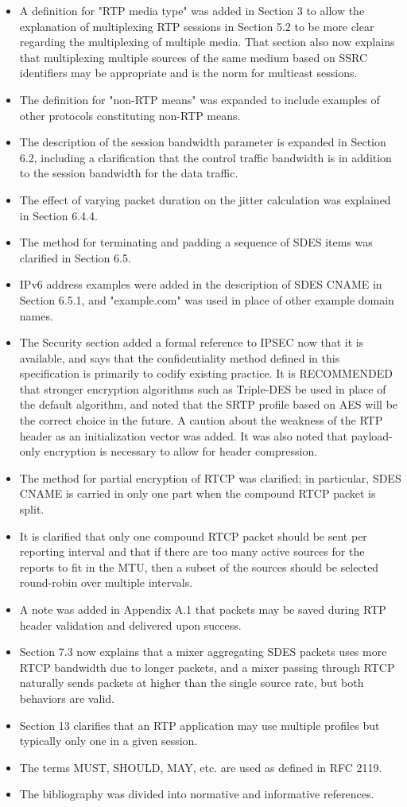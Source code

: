 \documentclass{article}
\begin{document}
\begin{itemize}
\begin{itemize}
\item A definition for "RTP media type" was added in Section 3 to allow the explanation of multiplexing RTP sessions in Section 5.2 to be more clear regarding the multiplexing of multiple media.  That section also now explains that multiplexing multiple sources of the same medium based on SSRC identifiers may be appropriate and is the norm for multicast sessions.
\item The definition for "non-RTP means" was expanded to include examples of other protocols constituting non-RTP means.
\item The description of the session bandwidth parameter is expanded in Section 6.2, including a clarification that the control traffic bandwidth is in addition to the session bandwidth for the data traffic.
\item The effect of varying packet duration on the jitter calculation was explained in Section 6.4.4.
\item The method for terminating and padding a sequence of SDES items was clarified in Section 6.5.
\item IPv6 address examples were added in the description of SDES CNAME in Section 6.5.1, and "example.com" was used in place of other example domain names.
\item The Security section added a formal reference to IPSEC now that it is available, and says that the confidentiality method defined in this specification is primarily to codify existing practice.  It is RECOMMENDED that stronger encryption algorithms such as Triple-DES be used in place of the default algorithm, and noted that the SRTP profile based on AES will be the correct choice in the future.  A caution about the weakness of the RTP header as an initialization vector was added.  It was also noted that payload-only encryption is necessary to allow for header compression.
\item The method for partial encryption of RTCP was clarified; in particular, SDES CNAME is carried in only one part when the compound RTCP packet is split.
\item It is clarified that only one compound RTCP packet should be sent per reporting interval and that if there are too many active sources for the reports to fit in the MTU, then a subset of the sources should be selected round-robin over multiple intervals.
\item A note was added in Appendix A.1 that packets may be saved during RTP header validation and delivered upon success.
\item Section 7.3 now explains that a mixer aggregating SDES packets uses more RTCP bandwidth due to longer packets, and a mixer passing through RTCP naturally sends packets at higher than the single source rate, but both behaviors are valid.
\item Section 13 clarifies that an RTP application may use multiple profiles but typically only one in a given session.
\item The terms MUST, SHOULD, MAY, etc. are used as defined in RFC 2119.
\item The bibliography was divided into normative and informative references.
\end{itemize}
\end{itemize}
\end{document}
